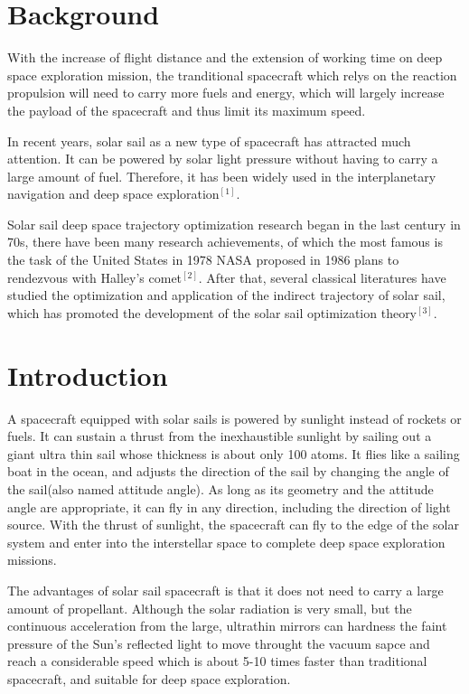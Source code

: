 \documentclass[../Paper.tex]{subfiles}
\begin{document}
\section{Background}

With the increase of flight distance and the extension of working time on deep space exploration mission, the tranditional spacecraft which relys on the reaction propulsion will need to carry more fuels and energy, which will largely increase the payload of the spacecraft and thus limit its maximum speed.            

In recent years, solar sail as a new type of spacecraft has attracted much attention. It can be powered by solar light pressure without having to carry a large amount of fuel. Therefore, it has been widely used in the interplanetary navigation and deep space exploration$^{[1]}$. 

Solar sail deep space trajectory optimization research began in the last century in 70s, there have been many research achievements, of which the most famous is the task of the United States in 1978 NASA proposed in 1986 plans to rendezvous with Halley's comet$^{[2]}$. After that, several classical literatures have studied the optimization and application of the indirect trajectory of solar sail, which has promoted the development of the solar sail optimization theory$^{[3]}$. 

\section{Introduction}	

A spacecraft equipped with solar sails is powered by sunlight instead of rockets or fuels. It can sustain a thrust from the inexhaustible sunlight by sailing out a giant ultra thin sail whose thickness is about only 100 atoms. It flies like a sailing boat in the ocean, and adjusts the direction of the sail by changing the angle of the sail(also named attitude angle). As long as its geometry and the attitude angle are appropriate, it can fly in any direction, including the direction of light source. With the thrust of sunlight, the spacecraft can fly to the edge of the solar system and enter into the interstellar space to complete deep space exploration missions. 

The advantages of solar sail spacecraft is that it does not need to carry a large amount of propellant. Although the solar radiation is very small, but the continuous acceleration from the large, ultrathin mirrors can hardness the faint pressure of the Sun's reflected light to move throught the vacuum sapce and reach a considerable speed which is about 5-10 times faster than traditional spacecraft, and suitable for deep space exploration.            
\\
\end{document}

